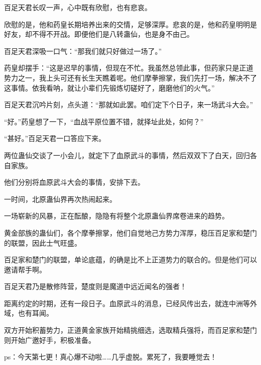 \begin{this_body}
百足天君长叹一声，心中既有欣慰，也有悲哀。

欣慰的是，他和药皇长期培养出来的交情，足够深厚。悲哀的是，他和药皇明明是好友，却不得不开战。即便他们是八转蛊仙，也是身不由己。

百足天君深吸一口气：“那我们就只好做过一场了。”

药皇却摆手：“这是迟早的事情，但现在不忙。我虽然总领此事，但药家只是正道势力之一，我上头可还有长生天瞧着呢。他们摩拳擦掌，我们先打一场，解决不了这事情。依我看呐，就让小辈们先锻炼切磋好了，磨磨他们的火气。”

百足天君沉吟片刻，点头道：“那就如此罢。咱们定下个日子，来一场武斗大会。”

“好。”药皇想了一下，“血战平原位置不错，就择址此处，如何？”

“甚好。”百足天君一口答应下来。

两位蛊仙交谈了一小会儿，就定下了血原武斗的事情，然后双双下了白天，回归各自家族。

他们分别将血原武斗大会的事情，安排下去。

一时间，北原蛊仙界再次热闹起来。

一场崭新的风暴，正在酝酿，隐隐有将整个北原蛊仙界席卷进来的趋势。

黄金部族的蛊仙们，各个摩拳擦掌，他们自觉地己方势力浑厚，稳压百足家和楚门的联盟，因此士气旺盛。

百足家和楚门的联盟，单论底蕴，的确是比不上正道势力的联合的。但是他们可以邀请帮手啊。

百足天君乃是散修阵营，楚度则是魔道中远近闻名的强者！

距离约定的时期，还有一段日子。血原武斗的消息，已经风传出去，就连中洲等外域，也有耳闻。

双方开始积蓄势力，正道黄金家族开始精挑细选，选取精兵强将，而百足家和楚门则开始广邀好手，积极准备。

ps：今天第七更！真心爆不动啦……几乎虚脱。累死了，我要睡觉去！

\end{this_body}

